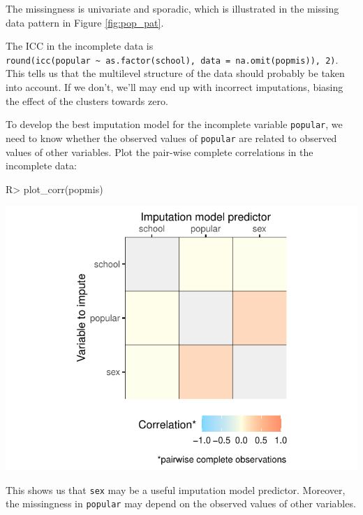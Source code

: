 \documentclass[
]{jss}
\begin{document}
The missingness is univariate and sporadic, which is illustrated in the
missing data pattern in Figure \ref{fig:pop_pat}.

The ICC in the incomplete data is
\texttt{round(icc(popular\ \textasciitilde{}\ as.factor(school),\ data\ =\ na.omit(popmis)),\ 2)}.
This tells us that the multilevel structure of the data should probably
be taken into account. If we don't, we'll may end up with incorrect
imputations, biasing the effect of the clusters towards zero.

To develop the best imputation model for the incomplete variable
\texttt{popular}, we need to know whether the observed values of
\texttt{popular} are related to observed values of other variables. Plot
the pair-wise complete correlations in the incomplete data:

\begin{CodeChunk}
\begin{CodeInput}
R> plot_corr(popmis)
\end{CodeInput}


\begin{center}\includegraphics{Imputation_of_Incomplete_Multilevel_Data_files/figure-latex/pop-corr-1} \end{center}

\end{CodeChunk}

This shows us that \texttt{sex} may be a useful imputation model
predictor. Moreover, the missingness in \texttt{popular} may depend on
the observed values of other variables.
\end{document}
